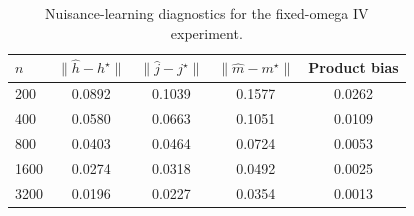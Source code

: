 \begin{table}[t]
\centering
\small
\setlength{\tabcolsep}{5pt}
\caption{Nuisance-learning diagnostics for the fixed-omega IV experiment.}
\label{tab:generated-iv-nuisance}
\begin{tabular}{lcccc}
\toprule
$n$ & $\|\hat h-h^\star\|$ & $\|\hat j-j^\star\|$ & $\|\hat m-m^\star\|$ & Product bias \\
\midrule
200 & 0.0892 & 0.1039 & 0.1577 & 0.0262 \\
400 & 0.0580 & 0.0663 & 0.1051 & 0.0109 \\
800 & 0.0403 & 0.0464 & 0.0724 & 0.0053 \\
1600 & 0.0274 & 0.0318 & 0.0492 & 0.0025 \\
3200 & 0.0196 & 0.0227 & 0.0354 & 0.0013 \\
\bottomrule
\end{tabular}
\end{table}
